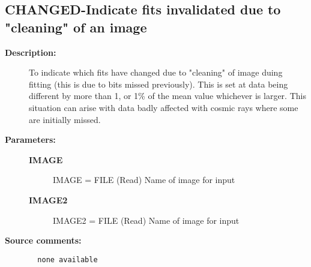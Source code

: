 \subsection{CHANGED-\label{CHANGED}Indicate fits invalidated due to "cleaning" of an image}
\begin{description}

\item [{\bf Description:}]
  To indicate which fits have changed due to "cleaning" of image duing
  fitting (this is due to bits missed previously). This is set at data
  being different by more than 1, or 1\% of the mean value whichever is
  larger. This situation can arise with data badly affected with cosmic
  rays where some are initially missed.

\item [{\bf Parameters:}]
\begin{description}
\item [{\bf IMAGE}]
    IMAGE = FILE (Read)
        Name of image for input
\item [{\bf IMAGE2}]
    IMAGE2 = FILE (Read)
        Name of image for input
\end{description}

\item [{\bf Source comments:}]
\begin{verbatim}
  none available

\end{verbatim}
\end{description}
